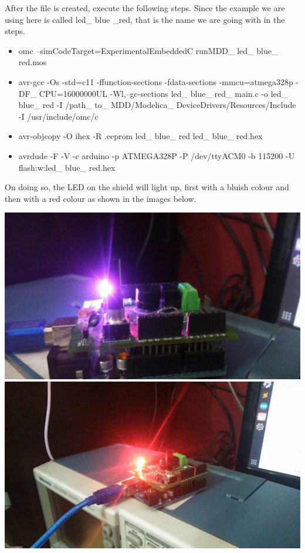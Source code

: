 \documentclass{hitec}
\begin{document}
After the file is created, execute the following steps. Since the example we are using here is called led\_ blue \_red, that is the name we are going with in the steps.
\\
\begin{itemize}
\item  omc --simCodeTarget=ExperimentalEmbeddedC runMDD\_ led\_ blue\_ red.mos
\item avr-gcc -Os -std=c11 -ffunction-sections -fdata-sections -mmcu=atmega328p -DF\_ CPU=16000000UL -Wl,--gc-sections led\_ blue\_ red\_ main.c -o led\_ blue\_ red -I /path\_ to\_ MDD/Modelica\_ DeviceDrivers/Resources/Include -I /usr/include/omc/c
\item  avr-objcopy -O ihex -R .eeprom led\_ blue\_ red led\_ blue\_ red.hex
\item avrdude -F -V -c arduino -p ATMEGA328P -P /dev/ttyACM0 -b 115200 -U flash:w:led\_ blue\_ red.hex

\end{itemize}

On doing so, the LED on the shield will light up, first with a bluish colour and then with a red colour as shown in the images below. 


\begin{center}
\includegraphics[scale=0.1]{IMG_20180427_131831.jpg}
\includegraphics[scale=0.1]{Shield_With_Code.jpg}
\end{center}
\end{document}
